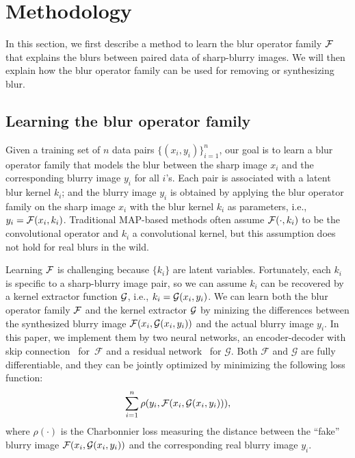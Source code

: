 \documentclass[final]{cvpr}
\begin{document}
\section{Methodology}


In this section, we first describe a method to learn the blur operator family $\mathcal{F}$ that explains the blurs between paired data of sharp-blurry images. We will then explain how the blur operator family can be used for removing or synthesizing blur. 


\subsection{Learning the blur operator family} \label{subsec:encode}

Given a training set of $n$ data pairs $\{(x_i, y_i)\}_{i=1}^{n}$, our goal is to learn a blur operator family that models the blur between the sharp image $x_i$ and the corresponding blurry image $y_i$ for all $i$'s. Each pair is associated with a latent blur kernel $k_i$; and the blurry image $y_i$ is obtained by applying the blur operator family on the sharp image $x_i$ with the blur kernel $k_i$ as parameters, i.e., $y_i = \mathcal{F}(x_i, k_i)$.  Traditional MAP-based methods often assume  $\mathcal{F}(\cdot, k_i)$ to be the convolutional operator and $k_i$ a convolutional kernel, but this assumption does not hold for real blurs in the wild. 


Learning $\mathcal{F}$ is challenging because $\{k_i\}$ are latent variables. Fortunately, each $k_i$ is specific to a sharp-blurry image pair, so we can assume $k_i$ can be recovered by a kernel extractor function $\mathcal{G}$, i.e., $k_i = \mathcal{G}(x_i, y_i)$. We can  learn both the blur operator family $\mathcal{F}$ and the kernel extractor $\mathcal{G}$ by minizing the differences between the synthesized blurry image $\mathcal{F}(x_i, \mathcal{G}(x_i, y_i))$ and the actual blurry image $y_i$. In this paper, we implement them by two neural networks, an encoder-decoder with skip connection~\cite{ronneberger2015u} for~$\mathcal{F}$ and a residual network~\cite{he2016deep} for $\mathcal{G}$. Both $\mathcal{F}$ and $\mathcal{G}$ are fully differentiable, and they can be jointly optimized by minimizing the following loss function:
\begin{align}
    \sum_{i=1}^{n} \rho(y_i, \mathcal{F}(x_i, \mathcal{G}(x_i, y_i))),
    \label{eq:obj_encode}
\end{align}
where $\rho(\cdot)$ is the Charbonnier loss \cite{lai2017deep} measuring the distance between the ``fake'' blurry image $\mathcal{F}(x_i, \mathcal{G}(x_i, y_i))$ and the corresponding real blurry image $y_i$.
\end{document}
